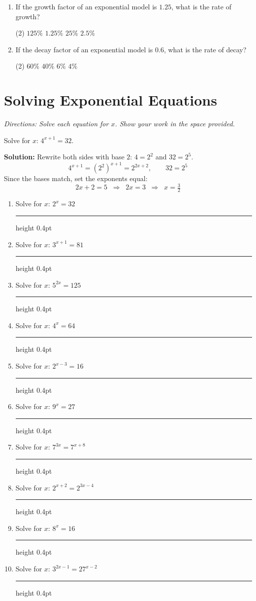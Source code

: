 \documentclass[11pt]{article}
\newcommand{\workline}{\par\vspace{6pt}\textcolor{rulegray}{\hrule height 0.4pt}\vspace{18pt}}
\begin{document}
\begin{enumerate}[leftmargin=1.5em, itemsep=10pt]
\item If the growth factor of an exponential model is $1.25$, what is the rate of growth?
\begin{tasks}(2)
  \task $125\%$
  \task $1.25\%$
  \task $25\%$
  \task $2.5\%$
\end{tasks}

\item If the decay factor of an exponential model is $0.6$, what is the rate of decay?
\begin{tasks}(2)
  \task $60\%$
  \task $40\%$
  \task $6\%$
  \task $4\%$
\end{tasks}

\end{enumerate}

\newpage
\section{Solving Exponential Equations}
\textit{Directions: Solve each equation for $x$. Show your work in the space provided.}

\begin{example}
Solve for $x$: \quad $4^{x+1} = 32$.

\textbf{Solution:} Rewrite both sides with base $2$: $4 = 2^2$ and $32 = 2^5$.
\[
4^{x+1} = \left(2^2\right)^{x+1} = 2^{2x+2}, \qquad 32 = 2^5
\]
Since the bases match, set the exponents equal:
\[
2x + 2 = 5 \;\;\Longrightarrow\;\; 2x = 3 \;\;\Longrightarrow\;\; x = \tfrac{3}{2}
\]
\end{example}

\begin{enumerate}[leftmargin=1.5em, itemsep=2pt]

\item Solve for $x$: \quad $2^x = 32$
\workline

\item Solve for $x$: \quad $3^{x+1} = 81$
\workline

\item Solve for $x$: \quad $5^{2x} = 125$
\workline

\item Solve for $x$: \quad $4^x = 64$
\workline

\item Solve for $x$: \quad $2^{x-3} = 16$
\workline

\item Solve for $x$: \quad $9^x = 27$
\workline

\item Solve for $x$: \quad $7^{3x} = 7^{x+8}$
\workline

\item Solve for $x$: \quad $2^{x+2} = 2^{3x-4}$
\workline

\item Solve for $x$: \quad $8^x = 16$
\workline

\item Solve for $x$: \quad $3^{2x-1} = 27^{x-2}$
\workline

\end{enumerate}
\end{document}
